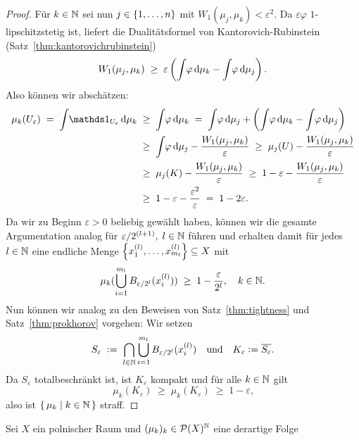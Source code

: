 \documentclass[../main/main.tex]{subfiles}
\begin{document}
\begin{proof}
		Für  $k \in \mathbb{N}$ sei nun $j \in \left\{1, \dots, n\right\}$ mit $W_1(\mu_j, \mu_k) < \varepsilon^2$. Da $\varepsilon\varphi$ $1$-lipschitzstetig ist, liefert die 
		Dualitätsformel von Kantorovich-Rubinstein (Satz~\ref{thm:kantorovichrubinstein})
		\[ W_1(\mu_j, \mu_k) \; \geq \; \varepsilon \left( \int_{} \, \varphi \, \mathrm{d}\mu_k - \int_{} \, \varphi \, \mathrm{d}\mu_j \right) \text{.} \]
		Also können wir abschätzen:
		\begin{align*}
			\mu_k(U_\varepsilon) \; = \; \measureint{}{\indfct_{U_\varepsilon}}{\mu_k} \; &\geq \; \measureint{}{\varphi}{\mu_k} \; = \; \measureint{}{\varphi}{\mu_j} + \left( \measureint{}{\varphi}{\mu_k} - \measureint{}{\varphi}{\mu_j} \right) \\
			                                                                              &\geq \; \measureint{}{\varphi}{\mu_j} - \frac{W_1(\mu_j, \mu_k)}{\varepsilon} \; \geq \; \mu_j(U) - \frac{W_1(\mu_j, \mu_k)}{\varepsilon} \\
			                                                                              &\geq \; \mu_j(K) - \frac{W_1(\mu_j, \mu_k)}{\varepsilon} \; \geq \; 1 - \varepsilon - \frac{W_1(\mu_j, \mu_k)}{\varepsilon} \\
			                                                                              &\geq \; 1 - \varepsilon - \frac{\varepsilon^2}{\varepsilon} \; = \; 1 - 2\varepsilon \text{.}
		\end{align*}
		Da wir zu Beginn $\varepsilon > 0$ beliebig gewählt haben, können wir die gesamte Argumentation analog für $\varepsilon/2^{(l+1)}, \; l \in \mathbb{N}$ führen und erhalten damit für jedes $l \in \mathbb{N}$ 
		eine endliche Menge $\left\{x_1^{(l)}, \dots, x_{m_l}^{(l)}\right\} \subseteq X$ mit
		\[ \mu_k(\bigcup_{i=1}^{m_l} B_{\varepsilon/2^l}(x_i^{(l)})) \; \geq \; 1 - \frac{\varepsilon}{2^l}, \quad k \in \mathbb{N} \text{.} \]
		Nun können wir analog zu den Beweisen von Satz~\ref{thm:tightness} und Satz~\ref{thm:prokhorov} vorgehen:
		Wir setzen
		\[ S_{\varepsilon} \; \vcentcolon = \; \bigcap_{l \in \mathbb{N}} \bigcup_{i=1}^{m_l} B_{\varepsilon/2^l}(x_i^{(l)}) \quad \text{und} \quad K_{\varepsilon} \vcentcolon = \overline{S_\varepsilon} \text{.} \]
		Da $S_{\varepsilon}$ totalbeschränkt ist, ist $K_{\varepsilon}$ kompakt und für alle $k \in \mathbb{N}$ gilt
		\[ \mu_k(K_{\varepsilon}) \; \geq \; \mu_k(K_{\varepsilon}) \; \geq \; 1 - \varepsilon \text{,} \]
		also ist $\left\{\, \mu_k \; \middle| \; k \in \mathbb{N} \,\right\}$ straff.
	\end{proof}

	\begin{Hilfssatz}
		Sei $X$ ein polnischer Raum und $(\mu_k)_k \in \mathcal{P}(X)^{\mathbb{N}}$ eine derartige Folge
	\end{Hilfssatz}
\end{document}
